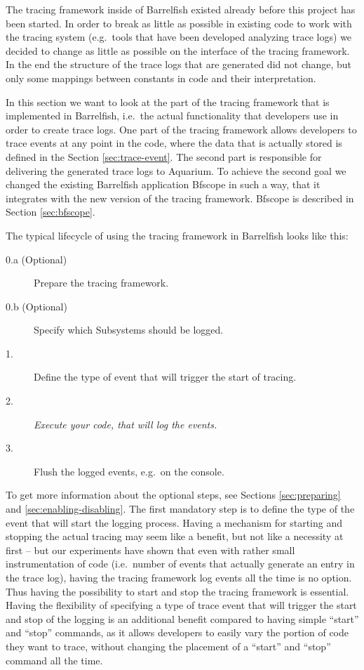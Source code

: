 \documentclass[a4paper,11pt,twoside]{report}
\begin{document}
The tracing framework inside of Barrelfish existed already before this project
has been started. In order to break as little as possible in existing code to
work with the tracing system (e.g.~tools that have been developed analyzing
trace logs) we decided to change as little as possible on the interface of the
tracing framework. In the end the structure of the trace logs that are generated
did not change, but only some mappings between constants in code and their
interpretation.

In this section we want to look at the part of the tracing framework that is
implemented in Barrelfish, i.e.~the actual functionality that developers use in
order to create trace logs. One part of the tracing framework allows developers
to trace events at any point in the code, where the data that is actually stored
is defined in the Section \ref{sec:trace-event}. The second part is responsible
for delivering the generated trace logs to Aquarium. To achieve the second goal
we changed the existing Barrelfish application Bfscope in such a way, that it
integrates with the new version of the tracing framework. Bfscope is described
in Section \ref{sec:bfscope}.

The typical lifecycle of using the tracing framework in Barrelfish looks like
this:

\begin{description}
	\item[0.a (Optional)] Prepare the tracing framework.
	\item[0.b (Optional)] Specify which Subsystems should be logged.
	\item[1.] Define the type of event that will trigger the start of tracing.
	\item[2.] \emph{Execute your code, that will log the events.}
	\item[3.] Flush the logged events, e.g.~on the console.
\end{description}

To get more information about the optional steps, see Sections
\ref{sec:preparing} and \ref{sec:enabling-disabling}. The first mandatory step
is to define the type of the event that will start the logging process. Having a
mechanism for starting and stopping the actual tracing may seem like a benefit,
but not like a necessity at first -- but our experiments have shown that even
with rather small instrumentation of code (i.e.~number of events that actually
generate an entry in the trace log), having the tracing framework log events all
the time is no option. Thus having the possibility to start and stop the tracing
framework is essential. Having the flexibility of specifying a type of trace
event that will trigger the start and stop of the logging is an additional
benefit compared to having simple ``start'' and ``stop'' commands, as it allows
developers to easily vary the portion of code they want to trace, without
changing the placement of a ``start'' and ``stop'' command all the time.
\end{document}
